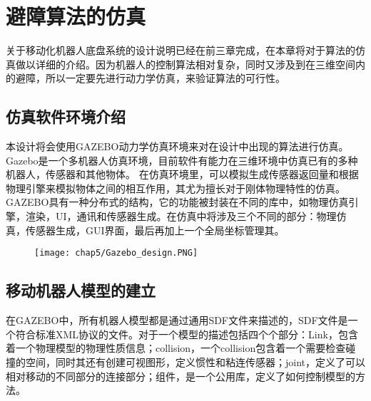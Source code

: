 

\chapter{避障算法的仿真}
\label{chap:simulation}
关于移动化机器人底盘系统的设计说明已经在前三章完成，在本章将对于算法的仿真做以详细的介绍。因为机器人的控制算法相对复杂，同时又涉及到在三维空间内的避障，所以一定要先进行动力学仿真，来验证算法的可行性。

\section{仿真软件环境介绍}
本设计将会使用GAZEBO动力学仿真环境来对在设计中出现的算法进行仿真。Gazebo是一个多机器人仿真环境，目前软件有能力在三维环境中仿真已有的多种机器人，传感器和其他物体。 在仿真环境里，可以模拟生成传感器返回量和根据物理引擎来模拟物体之间的相互作用，其尤为擅长对于刚体物理特性的仿真。GAZEBO具有一种分布式的结构，它的功能被封装在不同的库中，如物理仿真引擎，渲染，UI，通讯和传感器生成。在仿真中将涉及三个不同的部分：物理仿真，传感器生成，GUI界面，最后再加上一个全局坐标管理其。
\begin{figure}[!htp]
  \centering
  \texttt{[image: chap5/Gazebo\_design.PNG]}
\end{figure}
\section{移动机器人模型的建立}
在GAZEBO中，所有机器人模型都是通过通用SDF文件来描述的，SDF文件是一个符合标准XML协议的文件。对于一个模型的描述包括四个个部分：Link，包含着一个物理模型的物理性质信息；collision，一个collision包含着一个需要检查碰撞的空间，同时其还有创建可视图形，定义惯性和粘连传感器；joint，定义了可以相对移动的不同部分的连接部分；组件，是一个公用库，定义了如何控制模型的方法。

